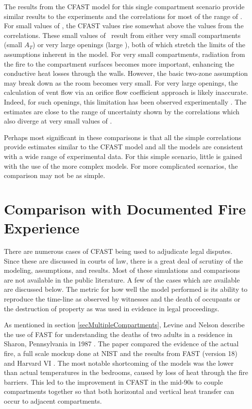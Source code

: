 The results from the CFAST model for this single compartment scenario provide similar results to the experiments and the correlations for most of the range of \asqh. For small values of \asqh, the CFAST values rise somewhat above the values from the correlations. These small values of \asqh \, result from either very small compartments (small $A_T$) or very large openings (large \asqh), both of which stretch the limits of the assumptions inherent in the model. For very small compartments, radiation from the fire to the compartment surfaces becomes more important, enhancing the conductive heat losses through the walls. However, the basic two-zone assumption may break down as the room becomes very small. For very large openings, the calculation of vent flow via an orifice flow coefficient approach is likely inaccurate. Indeed, for such openings, this limitation has been observed experimentally \cite{Valid:Babrauskas_Flashover}. The estimates are close to the range of uncertainty shown by the correlations which also diverge at very small values of \asqh.

Perhaps most significant in these comparisons is that all the simple correlations provide estimates similar to the CFAST model and all the models are consistent with a wide range of experimental data. For this simple scenario, little is gained with the use of the more complex models. For more complicated scenarios, the comparison may not be as simple.

\section {Comparison with Documented Fire Experience}

There are numerous cases of CFAST being used to adjudicate legal disputes. Since these are discussed in courts of law, there is a great deal of scrutiny of the modeling, assumptions, and results. Most of these simulations and comparisons are not available in the public literature. A few of the cases which are available are discussed below. The metric for how well the model performed is its ability to reproduce the time-line as observed by witnesses and the death of occupants or the destruction of property as was used in evidence in legal proceedings.

As mentioned in section \ref{secMultipleCompartments}, Levine and Nelson describe the use of FAST for understanding the deaths of two adults in a residence in Sharon, Pennsylvania in 1987 \cite{Valid:Levine}. The paper compared the evidence of the actual fire, a full scale mockup done at NIST and the results from FAST (version 18) \cite{Jones:1985} and Harvard VI \cite{Rockett:1985}. The most notable shortcoming of the models was the lower than actual temperatures in the bedrooms, caused by loss of heat through the fire barriers. This led to the improvement in CFAST in the mid-90s to couple compartments together so that both horizontal and vertical heat transfer can occur to adjacent compartments.

